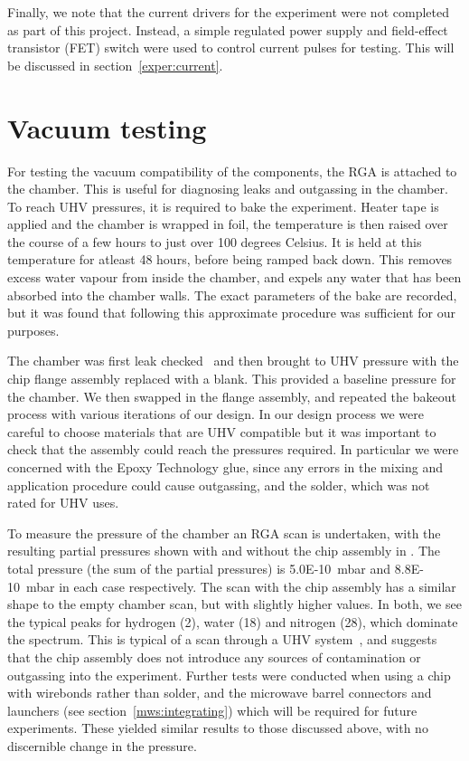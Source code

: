 Finally, we note that the current drivers for the experiment were not completed
as part of this project. Instead, a simple regulated power supply and
field-effect transistor (FET) switch were used to control current pulses for
testing. This will be discussed in section~\ref{exper:current}.

\section{Vacuum testing}

For testing the vacuum compatibility of the components, the RGA is attached to
the chamber. This is useful for diagnosing leaks and outgassing in the chamber.
To reach UHV pressures, it is required to bake the experiment.  Heater tape is
applied and the chamber is wrapped in foil, the temperature is then raised over
the course of a few hours to just over 100 degrees Celsius.  It is held at this
temperature for atleast 48 hours, before being ramped back down. This removes
excess water vapour from inside the chamber, and expels any water that has been
absorbed into the chamber walls. The exact parameters of the bake are recorded,
but it was found that following this approximate procedure was sufficient for
our purposes.

The chamber was first leak checked~\cite{PfeifferVacuum} and then brought to
UHV pressure with the chip flange assembly replaced with a blank. This provided
a baseline pressure for the chamber. We then swapped in the flange assembly,
and repeated the bakeout process with various iterations of our design. In our
design process we were careful to choose materials that are UHV compatible but
it was important to check that the assembly could reach the pressures required.
In particular we were concerned with the Epoxy Technology glue, since any
errors in the mixing and application procedure could cause outgassing, and the
solder, which was not rated for UHV uses.

To measure the pressure of the chamber an RGA scan is undertaken, with the
resulting partial pressures shown with and without the chip assembly in
. The total pressure (the sum of the partial pressures)
is \SI{5.0E-10}{\milli\bar} and \SI{8.8E-10}{\milli\bar} in each case
respectively. The scan with the chip assembly has a similar shape to the empty
chamber scan, but with slightly higher values.  In both, we see the typical
peaks for hydrogen (2), water (18) and nitrogen (28), which dominate the
spectrum. This is typical of a scan through a UHV system~\cite{PfeifferVacuum},
and suggests that the chip assembly does not introduce any sources of
contamination or outgassing into the experiment.
%
Further tests were conducted when using a chip with wirebonds rather than
solder, and the microwave barrel connectors and launchers (see
section~\ref{mws:integrating}) which will be required for future experiments.
These yielded similar results to those discussed above, with no discernible
change in the pressure.

